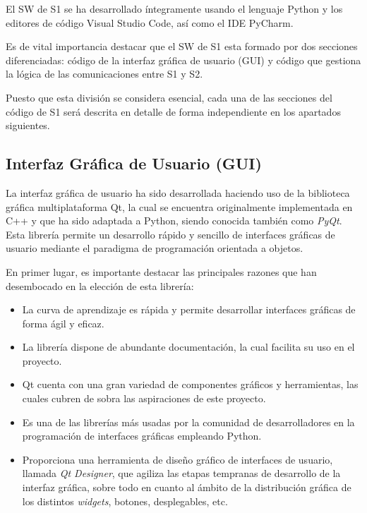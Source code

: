 El \ac{SW} de \ac{S1} se ha desarrollado íntegramente usando el lenguaje Python y los editores de código Visual Studio Code, así como el IDE PyCharm.

Es de vital importancia destacar que el \ac{SW} de \ac{S1} esta formado por dos secciones diferenciadas: código de la interfaz gráfica de usuario (GUI) y código que gestiona la lógica de las comunicaciones entre \ac{S1} y \ac{S2}.

Puesto que esta división se considera esencial, cada una de las secciones del código de \ac{S1} será descrita en detalle de forma independiente en los apartados siguientes.

\subsection{Interfaz Gráfica de Usuario (GUI)}

La interfaz gráfica de usuario ha sido desarrollada haciendo uso de la biblioteca gráfica multiplataforma Qt, la cual se encuentra originalmente implementada en C++ y que ha sido adaptada a Python, siendo conocida también como \textit{PyQt}. Esta librería permite un desarrollo rápido y sencillo de interfaces gráficas de usuario mediante el paradigma de programación orientada a objetos.

En primer lugar, es importante destacar las principales razones que han desembocado en la elección de esta librería:
\begin{itemize}
    \item La curva de aprendizaje es rápida y permite desarrollar interfaces gráficas de forma ágil y eficaz.
    \item La librería dispone de abundante documentación, la cual facilita su uso en el proyecto.
    \item Qt cuenta con una gran variedad de componentes gráficos y herramientas, las cuales cubren de sobra las aspiraciones de este proyecto.
    \item Es una de las librerías más usadas por la comunidad de desarrolladores en la programación de interfaces gráficas empleando Python.
    \item Proporciona una herramienta de diseño gráfico de interfaces de usuario, llamada \textit{Qt Designer}, que agiliza las etapas tempranas de desarrollo de la interfaz gráfica, sobre todo en cuanto al ámbito de la distribución gráfica de los distintos \textit{widgets}, botones, desplegables, etc.
\end{itemize}

